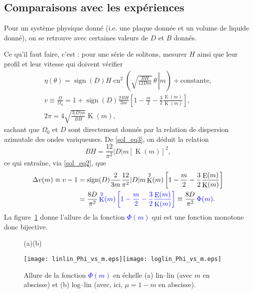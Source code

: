 \documentclass[10pt,a4paper, oneside, fleqn]{myarticle}
\DeclareMathOperator{\sign}{sign}
\DeclareMathOperator{\ellipE}{E}
\DeclareMathOperator{\ellipK}{K}
\DeclareMathOperator{\cn}{cn}
\begin{document}
\subsection{Comparaisons avec les expériences}

Pour un système physique donné (i.e. une plaque donnée et un volume de liquide donné), on se retrouve avec certaines valeurs de $D$ et $B$ donnés.

Ce qu'il faut faire, c'est : pour une série de solitons, mesurer $H$ ainsi que leur profil et leur vitesse qui doivent vérifier
\begin{gather}
  \eta(\theta) =  \sign(D) H \cn^2\left(\left. \sqrt{\frac{BH}{12Dm}}\,\theta\, \right\vert m\right) + \text{constante},\label{sol_eq1}\\
  v\equiv\frac{\Omega}{\Omega_0}=1+\sign(D) \frac{2BH}{3m}\left[1-\frac{m}{2}-\frac{3}{2}\frac{\ellipE(m)}{\ellipK(m)}\right],\label{sol_eq2}\\
  2\pi = 4 \sqrt{\frac{3|D|m}{BH}}\ellipK(m), \label{sol_eq3}%
\end{gather}
sachant que $\Omega_0$ et $D$ sont directement donnés par la relation de dispersion azimutale des ondes variqueuses. De \eqref{sol_eq3}, on déduit la relation
\begin{equation}
  BH = \frac{12}{\pi^2}|D| m \left[\ellipK(m)\right]^2,\label{trouver_B}
\end{equation}
ce qui entraîne, via \eqref{sol_eq2}, que
\begin{align}
  \Delta v (m) \equiv v-1 &=  \sign(D)\frac{2}{3m} \frac{12}{\pi^2}|D| m \ellipK^2(m)\left[1-\frac{m}{2}-\frac{3}{2}\frac{\ellipE(m)}{\ellipK(m)}\right]\\
  &= \frac{8 D}{\pi^2}\, \textcolor{blue}{\ellipK^2(m)\left[1-\frac{m}{2}-\frac{3}{2}\frac{\ellipE(m)}{\ellipK(m)}\right]}\equiv \frac{8 D}{\pi^2}\,\textcolor{blue}{\Phi(m)}.\label{trouver_m}
\end{align}
La figure~\ref{fig:Phi_de_m} donne l'allure de la fonction \textcolor{blue}{$\Phi(m)$} qui est une fonction monotone donc bijective. 

\begin{figure}[ht!]
  \centering

  \qquad (a)\hspace*{6.5cm}(b)

  \medskip
  
  \texttt{[image: linlin\_Phi\_vs\_m.eps]}\qquad\texttt{[image: loglin\_Phi\_vs\_m.eps]}
  \caption{Allure de la fonction \textcolor{blue}{$\Phi(m)$} en échelle (a) lin--lin (avec $m$ en abscisse) et (b) log--lin (avec, ici, $\mu = 1- m$ en abscisse).}\label{fig:Phi_de_m}
\end{figure}
\end{document}
